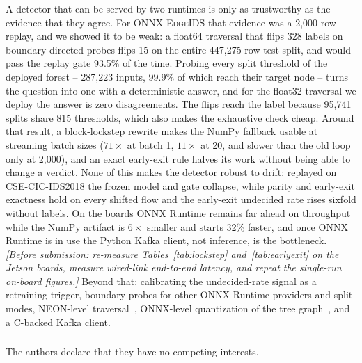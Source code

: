 \documentclass[runningheads]{llncs}
\newcommand{\ph}[1]{{\color{gray}\textit{[#1]}}}
\begin{document}
A detector that can be served by two runtimes is only as trustworthy as the evidence that they agree. For \textsc{ONNX-EdgeIDS} that evidence was a 2{,}000-row replay, and we showed it to be weak: a float64 traversal that flips 328 labels on boundary-directed probes flips 15 on the entire 447{,}275-row test split, and would pass the replay gate 93.5\% of the time. Probing every split threshold of the deployed forest -- 287{,}223 inputs, 99.9\% of which reach their target node -- turns the question into one with a deterministic answer, and for the float32 traversal we deploy the answer is zero disagreements. The flips reach the label because 95{,}741 splits share 815 thresholds, which also makes the exhaustive check cheap. Around that result, a block-lockstep rewrite makes the NumPy fallback usable at streaming batch sizes ($71\times$ at batch 1, $11\times$ at 20, and slower than the old loop only at 2{,}000), and an exact early-exit rule halves its work without being able to change a verdict. None of this makes the detector robust to drift: replayed on CSE-CIC-IDS2018 the frozen model and gate collapse, while parity and early-exit exactness hold on every shifted flow and the early-exit undecided rate rises sixfold without labels. On the boards ONNX Runtime remains far ahead on throughput while the NumPy artifact is $6\times$ smaller and starts 32\% faster, and once ONNX Runtime is in use the Python Kafka client, not inference, is the bottleneck. \ph{Before submission: re-measure Tables~\ref{tab:lockstep} and~\ref{tab:earlyexit} on the Jetson boards, measure wired-link end-to-end latency, and repeat the single-run on-board figures.} Beyond that: calibrating the undecided-rate signal as a retraining trigger, boundary probes for other ONNX Runtime providers and split modes, NEON-level traversal~\cite{koschel2023arm}, ONNX-level quantization of the tree graph~\cite{eren2026drdos}, and a C-backed Kafka client.

\begin{credits}
\subsubsection{\discintname}
The authors declare that they have no competing interests.
\end{credits}



\end{document}
